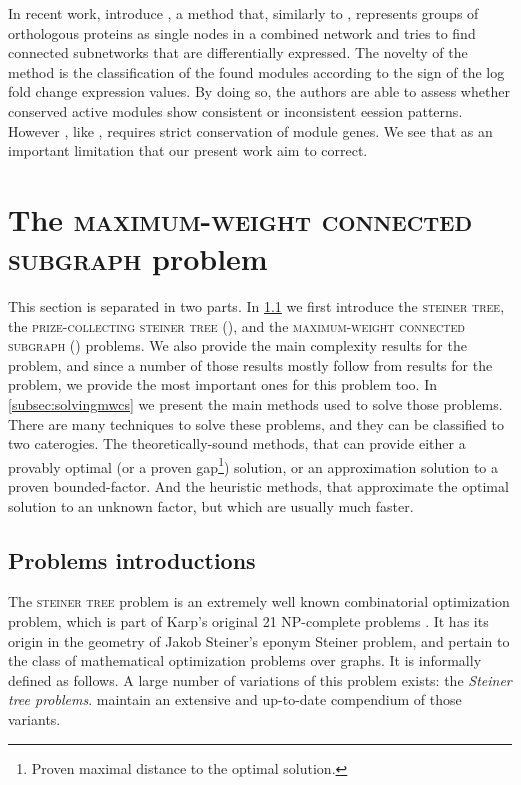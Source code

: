 	In recent work, \textcite{zinman2015moduleblast} introduce \moduleblast{}, a method that, similarly to \nexus{}, represents groups of orthologous proteins as single nodes in a combined network and tries to find connected subnetworks that are differentially expressed.
	The novelty of the method is the classification of the found modules according to the sign of the log fold change expression values.
	By doing so, the authors are able to assess whether conserved active modules show consistent or inconsistent
  eession patterns.
	However \moduleblast{}, like \nexus{}, requires strict conservation of module genes.
	We see that as an important limitation that our present work aim to correct.

\section{The \textsc{maximum-weight connected subgraph} problem}
\label{sec:mwcsproblem}

	This section is separated in two parts.
	In \cref{subsec:mwcsintro} we first introduce the \textsc{steiner tree}, the \textsc{prize-collecting steiner tree} (\pcst{}), and the \textsc{maximum-weight connected subgraph} (\mwcs{}) problems.
	We also provide the main complexity results for the \mwcs{} problem, and since a number of those results mostly follow from results for the \pcst{} problem, we provide the most important ones for this problem too.
	In \cref{subsec:solvingmwcs} we present the main methods used to solve those problems.
	There are many techniques to solve these problems, and they can be classified to two caterogies.
	The theoretically-sound methods, that can provide either a provably optimal (or a proven gap\footnote{Proven maximal distance to the optimal solution.}) solution, or an approximation solution to a proven bounded-factor.
	And the heuristic methods, that approximate the optimal solution to an unknown factor, but which are usually much faster.

	\subsection{Problems introductions}
	\label{subsec:mwcsintro}

	The \textsc{steiner tree} problem is an extremely well known combinatorial optimization problem, which is part of Karp's original 21 NP-complete problems \parencite{karp1972reducibility}.
	It has its origin in the geometry of Jakob Steiner's eponym Steiner problem, and pertain to the class of mathematical optimization problems over graphs.
	It is informally defined as follows.
	A large number of variations of this problem exists: the \emph{Steiner tree problems}.
	\Textcite{hauptmann2014compendium} maintain an extensive and up-to-date compendium of those variants.

